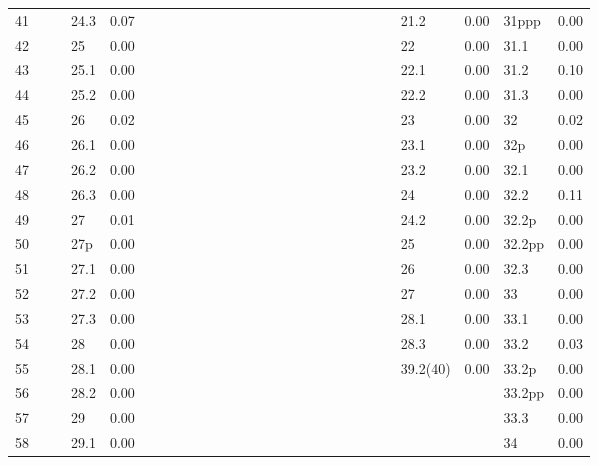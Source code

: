 \begin{table}[ht]
\begin{tabular}{rlrlrlrlrlrlrlrlrlrlrlrlrlr}
  41 &  &  & 24.3 & 0.07 &  &  &  &  &  &  &  &  &  &  &  &  &  &  &  &  &  &  & 21.2 & 0.00 & 31ppp & 0.00 \\ 
  42 &  &  & 25 & 0.00 &  &  &  &  &  &  &  &  &  &  &  &  &  &  &  &  &  &  & 22 & 0.00 & 31.1 & 0.00 \\ 
  43 &  &  & 25.1 & 0.00 &  &  &  &  &  &  &  &  &  &  &  &  &  &  &  &  &  &  & 22.1 & 0.00 & 31.2 & 0.10 \\ 
  44 &  &  & 25.2 & 0.00 &  &  &  &  &  &  &  &  &  &  &  &  &  &  &  &  &  &  & 22.2 & 0.00 & 31.3 & 0.00 \\ 
  45 &  &  & 26 & 0.02 &  &  &  &  &  &  &  &  &  &  &  &  &  &  &  &  &  &  & 23 & 0.00 & 32 & 0.02 \\ 
  46 &  &  & 26.1 & 0.00 &  &  &  &  &  &  &  &  &  &  &  &  &  &  &  &  &  &  & 23.1 & 0.00 & 32p & 0.00 \\ 
  47 &  &  & 26.2 & 0.00 &  &  &  &  &  &  &  &  &  &  &  &  &  &  &  &  &  &  & 23.2 & 0.00 & 32.1 & 0.00 \\ 
  48 &  &  & 26.3 & 0.00 &  &  &  &  &  &  &  &  &  &  &  &  &  &  &  &  &  &  & 24 & 0.00 & 32.2 & 0.11 \\ 
  49 &  &  & 27 & 0.01 &  &  &  &  &  &  &  &  &  &  &  &  &  &  &  &  &  &  & 24.2 & 0.00 & 32.2p & 0.00 \\ 
  50 &  &  & 27p & 0.00 &  &  &  &  &  &  &  &  &  &  &  &  &  &  &  &  &  &  & 25 & 0.00 & 32.2pp & 0.00 \\ 
  51 &  &  & 27.1 & 0.00 &  &  &  &  &  &  &  &  &  &  &  &  &  &  &  &  &  &  & 26 & 0.00 & 32.3 & 0.00 \\ 
  52 &  &  & 27.2 & 0.00 &  &  &  &  &  &  &  &  &  &  &  &  &  &  &  &  &  &  & 27 & 0.00 & 33 & 0.00 \\ 
  53 &  &  & 27.3 & 0.00 &  &  &  &  &  &  &  &  &  &  &  &  &  &  &  &  &  &  & 28.1 & 0.00 & 33.1 & 0.00 \\ 
  54 &  &  & 28 & 0.00 &  &  &  &  &  &  &  &  &  &  &  &  &  &  &  &  &  &  & 28.3 & 0.00 & 33.2 & 0.03 \\ 
  55 &  &  & 28.1 & 0.00 &  &  &  &  &  &  &  &  &  &  &  &  &  &  &  &  &  &  & 39.2(40) & 0.00 & 33.2p & 0.00 \\ 
  56 &  &  & 28.2 & 0.00 &  &  &  &  &  &  &  &  &  &  &  &  &  &  &  &  &  &  &  &  & 33.2pp & 0.00 \\ 
  57 &  &  & 29 & 0.00 &  &  &  &  &  &  &  &  &  &  &  &  &  &  &  &  &  &  &  &  & 33.3 & 0.00 \\ 
  58 &  &  & 29.1 & 0.00 &  &  &  &  &  &  &  &  &  &  &  &  &  &  &  &  &  &  &  &  & 34 & 0.00 \\ 

\end{tabular}
\end{table}
